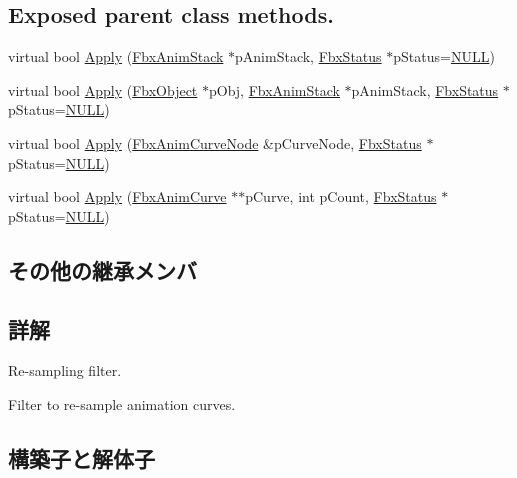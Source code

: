 \subsection*{Exposed parent class methods.}
\begin{DoxyCompactItemize}
\item 
virtual bool \hyperlink{class_fbx_anim_curve_filter_resample_a0f94e6a08f94ee1798b3bdce67285f53}{Apply} (\hyperlink{class_fbx_anim_stack}{Fbx\+Anim\+Stack} $\ast$p\+Anim\+Stack, \hyperlink{class_fbx_status}{Fbx\+Status} $\ast$p\+Status=\hyperlink{fbxarch_8h_a070d2ce7b6bb7e5c05602aa8c308d0c4}{N\+U\+LL})
\item 
virtual bool \hyperlink{class_fbx_anim_curve_filter_resample_a6f22a537869dc295ceff244f56ac561e}{Apply} (\hyperlink{class_fbx_object}{Fbx\+Object} $\ast$p\+Obj, \hyperlink{class_fbx_anim_stack}{Fbx\+Anim\+Stack} $\ast$p\+Anim\+Stack, \hyperlink{class_fbx_status}{Fbx\+Status} $\ast$p\+Status=\hyperlink{fbxarch_8h_a070d2ce7b6bb7e5c05602aa8c308d0c4}{N\+U\+LL})
\item 
virtual bool \hyperlink{class_fbx_anim_curve_filter_resample_a1359f91c344c6dd4d89fa0a883ae38b2}{Apply} (\hyperlink{class_fbx_anim_curve_node}{Fbx\+Anim\+Curve\+Node} \&p\+Curve\+Node, \hyperlink{class_fbx_status}{Fbx\+Status} $\ast$p\+Status=\hyperlink{fbxarch_8h_a070d2ce7b6bb7e5c05602aa8c308d0c4}{N\+U\+LL})
\item 
virtual bool \hyperlink{class_fbx_anim_curve_filter_resample_a2a095982e24a1ea1e35bc1ab97e833d7}{Apply} (\hyperlink{class_fbx_anim_curve}{Fbx\+Anim\+Curve} $\ast$$\ast$p\+Curve, int p\+Count, \hyperlink{class_fbx_status}{Fbx\+Status} $\ast$p\+Status=\hyperlink{fbxarch_8h_a070d2ce7b6bb7e5c05602aa8c308d0c4}{N\+U\+LL})
\end{DoxyCompactItemize}
\subsection*{その他の継承メンバ}


\subsection{詳解}
Re-\/sampling filter.

Filter to re-\/sample animation curves. 

\subsection{構築子と解体子}
\mbox{\label{class_fbx_anim_curve_filter_resample_ae5da0aba84bf6db3d9cda6a4aeb5824f}} 

